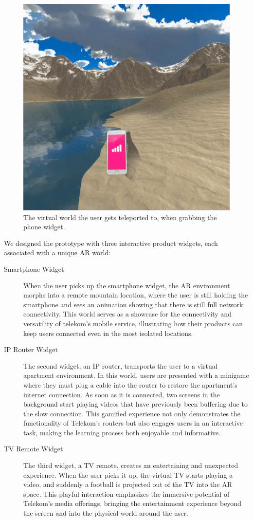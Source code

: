 \documentclass[12pt]{article}
\begin{document}
\begin{figure}[ht]
    \centering
    \includegraphics[width=0.5\linewidth]{images/phone_world.png}
    \caption{The virtual world the user gets teleported to, when grabbing the phone widget.}
    \label{fig:phone_world}
\end{figure}

We designed the prototype with three interactive product widgets, each associated with a unique AR world:
\begin{description}
    \item [Smartphone Widget] When the user picks up the smartphone widget, the AR environment morphs into a remote mountain location, where the user is still holding the smartphone and sees an animation showing that there is still full network connectivity. This world serves as a showcase for the connectivity and versatility of telekom's mobile service, illustrating how their products can keep users connected even in the most isolated locations. 

    \item [IP Router Widget] The second widget, an IP router, transports the user to a virtual apartment environment. In this world, users are presented with a minigame where they must plug a cable into the router to restore the apartment's internet connection. As soon as it is connected, two screens in the background start playing videos that have previously been buffering due to the slow connection. This gamified experience not only demonstrates the functionality of Telekom’s routers but also engages users in an interactive task, making the learning process both enjoyable and informative.

    \item [TV Remote Widget] The third widget, a TV remote, creates an entertaining and unexpected experience. When the user picks it up, the virtual TV starts playing a video, and suddenly a football is projected out of the TV into the AR space. This playful interaction emphasizes the immersive potential of Telekom’s media offerings, bringing the entertainment experience beyond the screen and into the physical world around the user.
    
\end{description}
\end{document}
